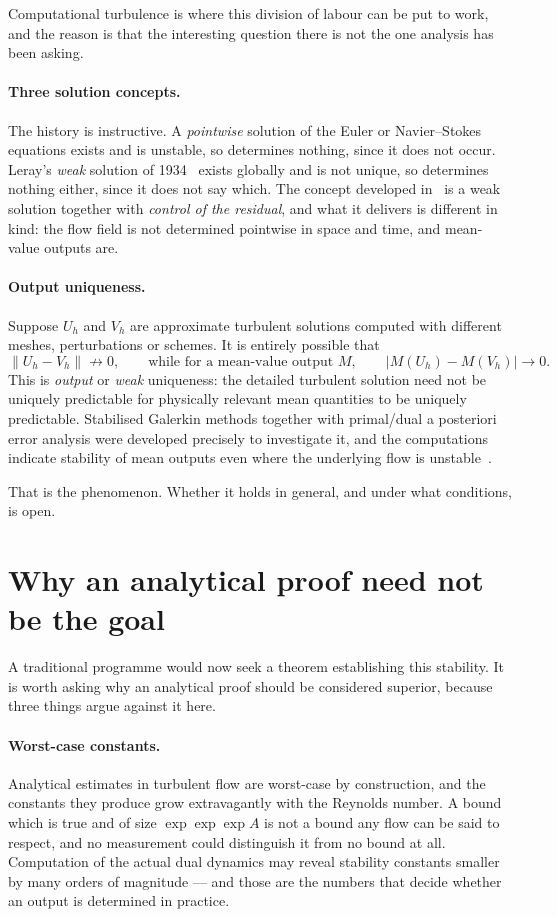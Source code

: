 \documentclass[11pt]{article}
\begin{document}
Computational turbulence is where this division of labour can be put to work, and the reason is that
the interesting question there is not the one analysis has been asking.

\paragraph{Three solution concepts.} The history is instructive. A \emph{pointwise} solution of the
Euler or Navier--Stokes equations exists and is unstable, so determines nothing, since it does not
occur. Leray's \emph{weak} solution of 1934~\cite{leray} exists globally and is not unique, so
determines nothing either, since it does not say which. The concept developed in~\cite{book} is a
weak solution together with \emph{control of the residual}, and what it delivers is different in
kind: the flow field is not determined pointwise in space and time, and mean-value outputs are.

\paragraph{Output uniqueness.} Suppose $U_h$ and $V_h$ are approximate turbulent solutions computed
with different meshes, perturbations or schemes. It is entirely possible that
\[
\|U_h-V_h\| \not\rightarrow 0 ,
\qquad\text{while for a mean-value output }M,\qquad
|M(U_h)-M(V_h)| \rightarrow 0 .
\]
This is \emph{output} or \emph{weak} uniqueness: the detailed turbulent solution need not be uniquely
predictable for physically relevant mean quantities to be uniquely predictable. Stabilised Galerkin
methods together with primal/dual a posteriori error analysis were developed precisely to investigate
it, and the computations indicate stability of mean outputs even where the underlying flow is
unstable~\cite{book,hjv,hjja}.

That is the phenomenon. Whether it holds in general, and under what conditions, is open.

\section{Why an analytical proof need not be the goal}\label{sec:proof}

A traditional programme would now seek a theorem establishing this stability. It is worth asking why
an analytical proof should be considered superior, because three things argue against it here.

\paragraph{Worst-case constants.} Analytical estimates in turbulent flow are worst-case by
construction, and the constants they produce grow extravagantly with the Reynolds number. A bound
which is true and of size $\exp\exp\exp A$ is not a bound any flow can be said to respect, and no
measurement could distinguish it from no bound at all. Computation of the actual dual dynamics may
reveal stability constants smaller by many orders of magnitude --- and those are the numbers that
decide whether an output is determined in practice.
\end{document}
